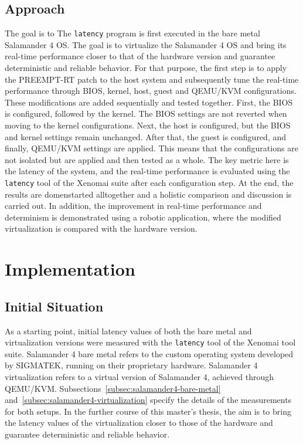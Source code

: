 \documentclass[MMR,Master,english]{twbook}
\begin{document}
\section{Approach}\label{sec:approach}
The goal is to The \texttt{latency} program is first executed in the bare metal Salamander 4 OS.
The goal is to virtualize the Salamander 4 OS and bring its real-time performance closer to that of the hardware version and guarantee deterministic and reliable behavior. For that purpose, the first step is to apply the PREEMPT-RT patch to the host system and subsequently tune the real-time performance through BIOS, kernel, host, guest and QEMU/KVM configurations. These modifications are added sequentially and tested together. First, the BIOS is configured, followed by the kernel. The BIOS settings are not reverted when moving to the kernel configurations. Next, the host is configured, but the BIOS and kernel settings remain unchanged. After that, the guest is configured, and finally, QEMU/KVM settings are applied. This means that the configurations are not isolated but are applied and then tested as a whole. The key metric here is the latency of the system, and the real-time performance is evaluated using the \texttt{latency} tool of the Xenomai suite after each configuration step. At the end, the results are domenstarted alltogether and a holistic comparison and discussion is carried out. In addition, the improvement in real-time performance and determinism is demonstrated using a robotic application, where the modified virtualization is compared with the hardware version.

\clearpage

\chapter{Implementation}

\section{Initial Situation}\label{sec:starting_situation}
As a starting point, initial latency values of both the bare metal and virtualization versions were measured with the \texttt{latency} tool of the Xenomai tool suite. Salamander 4 bare metal refers to the custom operating system developed by SIGMATEK, running on their proprietary hardware. Salamander 4 virtualization refers to a virtual version of Salamander 4, achieved through QEMU/KVM. Subsections~\ref{subsec:salamander4-bare-metal} and~\ref{subsec:salamander4-virtualization} specify the details of the measurements for both setups. In the further course of this master's thesis, the aim is to bring the latency values of the virtualization closer to those of the hardware and guarantee deterministic and reliable behavior.
\end{document}
